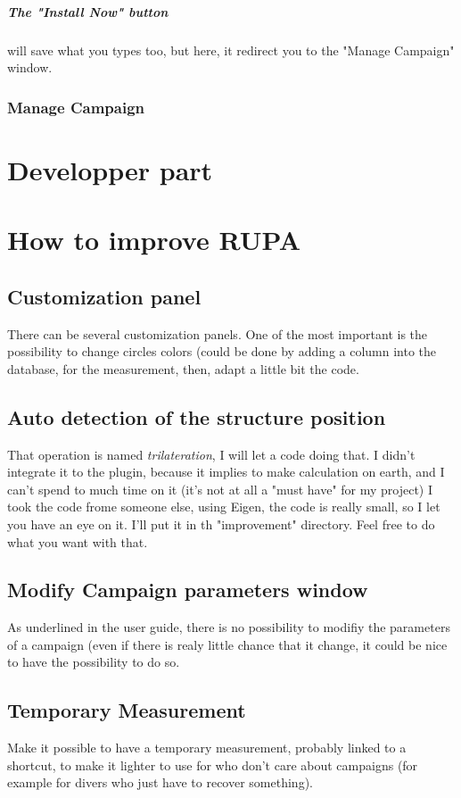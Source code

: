 \documentclass[11pt]{report}
\begin{document}
		    \paragraph{The "Install Now" button} will save what you types too, but here, it redirect you to the "Manage Campaign" window.

		\subsection{Manage Campaign}

	\chapter{Developper part}

	\chapter{How to improve RUPA}
	    \section{Customization panel}
		There can be several customization panels. One of the most important is the possibility to change circles
		colors (could be done by adding a column into the database, for the measurement, then, adapt a little bit the code.
	    
	    \section{Auto detection of the structure position}
		That operation is named \emph{trilateration}, I will let a code doing that. I didn't integrate it to the plugin, because 
		it implies to make calculation on earth, and I can't spend to much time on it (it's not at all a "must have" for my project)
		I took the code frome someone else, using Eigen, the code is really small, so I let you have an eye on it. I'll put it in
		th "improvement" directory. Feel free to do what you want with that.
	    \section{Modify Campaign parameters window}
		As underlined in the user guide, there is no possibility to modifiy the parameters of a campaign (even if there is realy 
		little chance that it change, it could be nice to have the possibility to do so.

	    \section{Temporary Measurement}
		Make it possible to have a temporary measurement, probably linked to a shortcut, to make it lighter to use for who don't 
		care about campaigns (for example for divers who just have to recover something).
\end{document}
